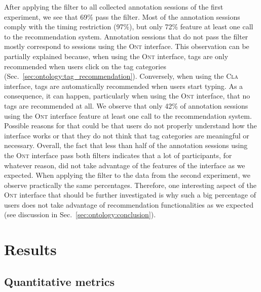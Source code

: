 After applying the filter to all collected annotation sessions of the first experiment, we see that 69\% pass the filter. 
Most of the annotation sessions comply with the timing restriction (97\%), but only 72\% feature at least one call to the recommendation system. 
Annotation sessions that do not pass the filter mostly correspond to sessions using the \textsc{Ont} interface.
This observation can be partially explained because, when using the \textsc{Ont} interface, tags are only recommended when users click on the tag categories (Sec.~\ref{sec:ontology:tag_recommendation}).
Conversely, when using the \textsc{Cla} interface, tags are automatically recommended when users start typing.
As a consequence, it can happen, particularly when using the \textsc{Ont} interface, that no tags are recommended at all.
We observe that only 42\% of annotation sessions using the \textsc{Ont} interface feature at least one call to the recommendation system.
Possible reasons for that could be that users do not properly understand how the interface works or that they do not think that tag categories are meaningful or necessary.
Overall, the fact that less than half of the annotation sessions using the \textsc{Ont} interface pass both filters indicates that a lot of participants, for whatever reason, did not take advantage of the features of the interface as we expected. 
When applying the filter to the data from the second experiment, we observe practically the same percentages.
Therefore, one interesting aspect of the \textsc{Ont} interface that should be further investigated is why such a big percentage of users does not take advantage of recommendation functionalities as we expected (see discussion in Sec.~\ref{sec:ontology:conclusion}).


\section{Results}
\label{sec:ontology:results}

\subsection{Quantitative metrics}
